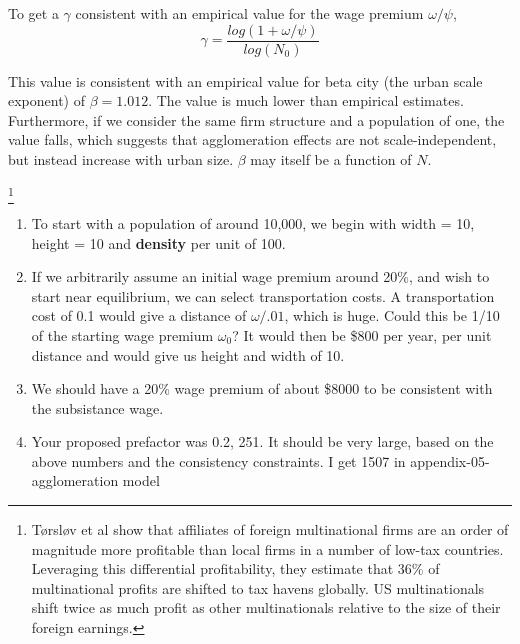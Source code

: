 To get a  $\gamma$  consistent with an empirical  value for  the wage premium  $\omega / \psi$, 
\begin{equation}
\gamma= \frac{log(1+\omega/\psi)}{log(N_0)}\label{eqn:gamma-define}
\end{equation}


This value is consistent with an empirical  value for beta city (the urban scale exponent) of $\beta =  1.012$. The value is much lower than empirical estimates. Furthermore, if we consider the same firm structure and a population of one, the value falls, which suggests that agglomeration effects are not scale-independent, but instead increase with urban size. $\beta$ may itself be a function of $N$.




\footnote{Tørsløv et al \cite{torslovMissingProfitsNations2023} show that affiliates of foreign multinational firms are an order of magnitude more profitable than local firms in a number of low-tax countries. Leveraging this differential profitability, they estimate that 36\% of multinational profits are shifted to tax havens globally. US multinationals shift twice as much profit as other multinationals relative to the size of their foreign earnings.}





\begin{enumerate}
\item To start with a population of around 10,000, we begin with width = 10, height = 10 and \textbf{density} per unit of 100. 

\item If we arbitrarily assume an initial wage premium around 20\%, and wish to start near equilibrium, %
we can select transportation costs. A transportation cost of 0.1  would give a distance of $\omega/.01$, which is huge. Could this be 1/10 of the starting wage premium $\omega_0$? It would then be \$800 per year, per unit distance and would give us height and width of 10. 
\item We should have a 20\% wage premium of about \$8000 to be consistent with the subsistance wage. %

\item Your proposed prefactor was 0.2,  251. It should be very large, based on the above numbers and the consistency constraints. I get 1507 in appendix-05-agglomeration model



\end{enumerate}

